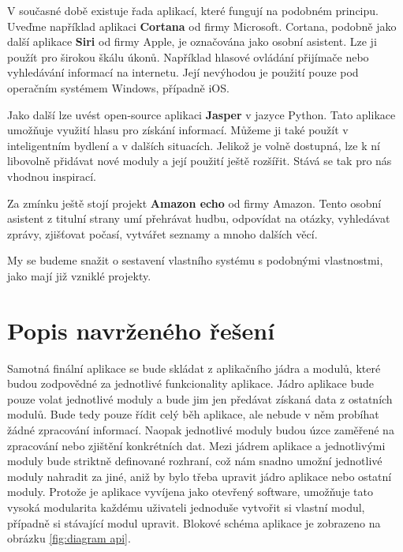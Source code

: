 \documentclass[12pt,a4paper]{article}
\begin{document}
V současné době existuje řada aplikací, které fungují na podobném principu. Uveďme například aplikaci \textbf{Cortana} od firmy Microsoft. Cortana, podobně jako další aplikace \textbf{Siri} od firmy Apple, je označována jako osobní asistent. Lze ji použít pro širokou škálu úkonů. Například hlasové ovládání přijímače nebo vyhledávání informací na internetu. Její nevýhodou je použití pouze pod operačním systémem Windows, případně iOS. 

Jako další lze uvést open-source aplikaci \textbf{Jasper} v jazyce Python. Tato aplikace umožňuje využití hlasu pro získání informací. Můžeme ji také použít v inteligentním bydlení a v dalších situacích. Jelikož je volně dostupná, lze k ní libovolně přidávat nové moduly a její použití ještě rozšířit. Stává se tak pro nás vhodnou inspirací. 

Za zmínku ještě stojí projekt \textbf{Amazon echo} od firmy Amazon. Tento osobní asistent z titulní strany umí přehrávat hudbu, odpovídat na otázky, vyhledávat zprávy, zjišťovat počasí, vytvářet seznamy a mnoho dalších věcí. 

My se budeme snažit o sestavení vlastního systému s podobnými vlastnostmi, jako mají již vzniklé projekty. 

\section*{Popis navrženého řešení}
Samotná finální aplikace se bude skládat z aplikačního jádra a modulů, které budou zodpovědné za jednotlivé funkcionality aplikace. Jádro aplikace bude pouze volat jednotlivé moduly a bude jim jen předávat získaná data z ostatních modulů. Bude tedy pouze řídit celý běh aplikace, ale nebude v něm probíhat žádné zpracování informací. Naopak jednotlivé moduly budou úzce zaměřené na zpracování nebo zjištění konkrétních dat. Mezi jádrem aplikace a jednotlivými moduly bude striktně definované rozhraní, což nám snadno umožní jednotlivé moduly nahradit za jiné, aniž by bylo třeba upravit jádro aplikace nebo ostatní moduly. Protože je aplikace vyvíjena jako otevřený software, umožňuje tato vysoká modularita každému uživateli jednoduše vytvořit si vlastní modul, případně si stávající modul upravit. Blokové schéma aplikace je zobrazeno na obrázku \ref{fig:diagram api}.
\end{document}
